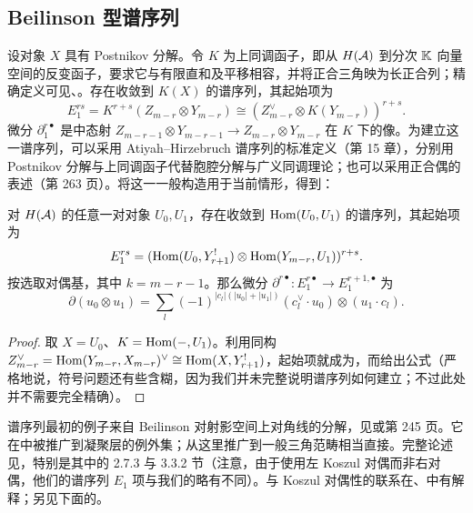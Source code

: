 \subsection{Beilinson 型谱序列}\label{sec:5l}
设对象 $X$ 具有 Postnikov 分解。令 $K$ 为上同调函子，即从 $H(\mathcal A)$ 到分次 $\mathbb K$ 向量空间的反变函子，要求它与有限直和及平移相容，并将正合三角映为长正合列；精确定义可见、。存在收敛到 $K(X)$ 的谱序列，其起始项为
\begin{equation}\label{eq:5.27}
E_1^{rs}=K^{r+s}(Z_{m-r}\otimes Y_{m-r})\cong(Z_{m-r}^{\vee}\otimes K(Y_{m-r}))^{r+s}.
\end{equation}
微分 $\partial_1^{r\bullet}$ 是中态射 $Z_{m-r-1}\otimes Y_{m-r-1}\to Z_{m-r}\otimes Y_{m-r}$ 在 $K$ 下的像。为建立这一谱序列，可以采用
Atiyah–Hirzebruch 谱序列的标准定义（第 15 章），分别用 Postnikov 分解与上同调函子代替胞腔分解与广义同调理论；也可以采用正合偶的表述（第 263 页）。将这一一般构造用于当前情形，得到：
\begin{proposition}\label{st:5.17}
对 $H(\mathcal A)$ 的任意一对对象 $U_0,U_1$，存在收敛到 $\operatorname{Hom}(U_0,U_1)$ 的谱序列，其起始项为
\begin{equation}\label{eq:5.28}
E_1^{rs}=(\operatorname{Hom}(U_0,Y^!_{r+1})\otimes\operatorname{Hom}(Y_{m-r},U_1))^{r+s}.
\end{equation}
按选取对偶基，其中 $k=m-r-1$。那么微分 $\partial^{r\bullet}:E_1^{r\bullet}\to E_1^{r+1,\bullet}$ 为
\begin{equation}\label{eq:5.29}
\partial(u_0\otimes u_1)=\sum_l(-1)^{|c_l|(|u_0|+|u_1|)}(c_l^{\vee}\cdot u_0)\otimes(u_1\cdot c_l).
\end{equation}
\end{proposition}
\begin{proof}
取 $X=U_0$、$K=\operatorname{Hom}(-,U_1)$。利用同构 $Z_{m-r}^{\vee}=\operatorname{Hom}(Y_{m-r},X_{m-r})^{\vee}\cong\operatorname{Hom}(X,Y^!_{r+1})$，起始项就成为，而给出公式（严格地说，符号问题还有些含糊，因为我们并未完整说明谱序列如何建立；不过此处并不需要完全精确）。
\end{proof}
\begin{note}\label{st:5.18}
谱序列最初的例子来自 Beilinson 对射影空间上对角线的分解，见或第 245 页。它在中被推广到凝聚层的例外集；从这里推广到一般三角范畴相当直接。完整论述见，特别是其中的 2.7.3 与 3.3.2 节（注意，由于使用左 Koszul 对偶而非右对偶，他们的谱序列 $E_1$ 项与我们的略有不同）。与 Koszul 对偶性的联系在、中有解释；另见下面的。
\end{note}


